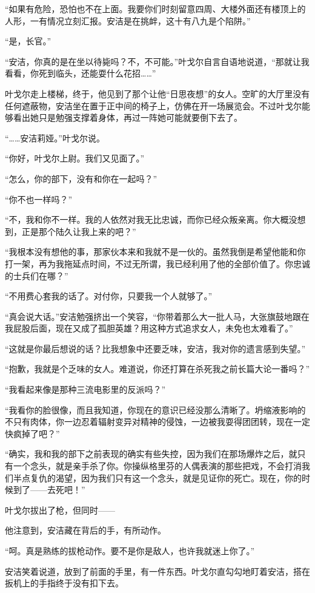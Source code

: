 “如果有危险，恐怕也不在上面。我要你们时刻留意四周、大楼外面还有楼顶上的人形，一有情况立刻汇报。安洁是在挑衅，这十有八九是个陷阱。”

“是，长官。”

“安洁，你真的是在坐以待毙吗？不，不可能。”叶戈尔自言自语地说道，“那就让我看看，你死到临头，还能耍什么花招……”

叶戈尔走上楼梯，终于，他见到了那个让他“日思夜想”的女人。空旷的大厅里没有任何遮蔽物，安洁坐在置于正中间的椅子上，仿佛在开一场展览会。不过叶戈尔能够看出她只是勉强支撑着身体，再过一阵她可能就要倒下去了。

“……安洁莉娅。”叶戈尔说。

“你好，叶戈尔上尉。我们又见面了。”

“怎么，你的部下，没有和你在一起吗？”

“你不也一样吗？”

“不，我和你不一样。我的人依然对我无比忠诚，而你已经众叛亲离。你大概没想到，正是那个陆久让我上来的吧？”

“我根本没有想他的事，那家伙本来和我就不是一伙的。虽然我倒是希望他能和你打一架，再为我拖延点时间，不过无所谓，我已经利用了他的全部价值了。你忠诚的士兵们在哪？”

“不用费心套我的话了。对付你，只要我一个人就够了。”

“真会说大话。”安洁勉强挤出一个笑容，“你带着那么大一批人马，大张旗鼓地跟在我屁股后面，现在又成了孤胆英雄？用这种方式追求女人，未免也太难看了。”

“这就是你最后想说的话？比我想象中还要乏味，安洁，我对你的遗言感到失望。”

“抱歉，我就是个乏味的女人。难道说，你还打算在杀死我之前长篇大论一番吗？”

“我看起来像是那种三流电影里的反派吗？”

“我看你的脸很像，而且我知道，你现在的意识已经没那么清晰了。坍缩液影响的不只有肉体，你一边忍着辐射变异对精神的侵蚀，一边被我耍得团团转，现在一定快疯掉了吧？”

“确实，我和我的部下之前表现的确实有些失控，因为我们在那场爆炸之后，就只有一个念头，就是亲手杀了你。你操纵格里芬的人偶表演的那些把戏，不会打消我们半点复仇的渴望，因为我们只有这一个念头，就是见证你的死亡。现在，你的时候到了——去死吧！”

叶戈尔拔出了枪，但同时——

他注意到，安洁藏在背后的手，有所动作。

“呵。真是熟练的拔枪动作。要不是你是敌人，也许我就迷上你了。”

安洁笑着说道，放到了前面的手里，有一件东西。叶戈尔直勾勾地盯着安洁，搭在扳机上的手指终于没有扣下去。

